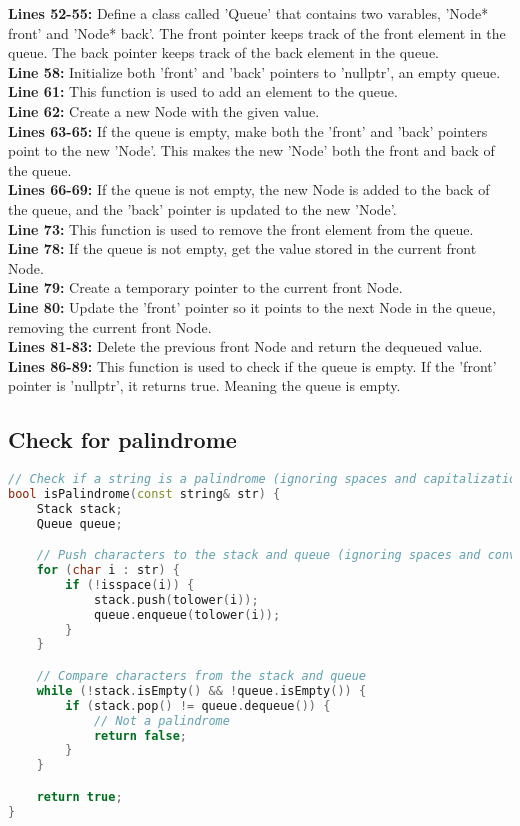 \documentclass[letterpaper, 10pt,DIV=13]{scrartcl}
\numberwithin{equation}{section} %
\numberwithin{figure}{section} %
\numberwithin{table}{section} %
\begin{document}
\textbf{Lines 52-55:} Define a class called 'Queue' that contains two varables, 'Node* front' and 'Node* back'. The front pointer keeps track of the front element in the queue. The back pointer keeps track of the back element in the queue. \\
\textbf{Line 58:} Initialize both 'front' and 'back' pointers to 'nullptr', an empty queue. \\
\textbf{Line 61:} This function is used to add an element to the queue. \\
\textbf{Line 62:} Create a new Node with the given value. \\ 
\textbf{Lines 63-65:} If the queue is empty, make both the 'front' and 'back' pointers point to the new 'Node'. This makes the new 'Node' both the front and back of the queue. \\
\textbf{Lines 66-69:} If the queue is not empty, the new Node is added to the back of the queue, and the 'back' pointer is updated to the new 'Node'. \\
\textbf{Line 73:} This function is used to remove the front element from the queue. \\
\textbf{Line 78:} If the queue is not empty, get the value stored in the current front Node. \\
\textbf{Line 79:} Create a temporary pointer to the current front Node. \\
\textbf{Line 80:} Update the 'front' pointer so it points to the next Node in the queue, removing the current front Node. \\
\textbf{Lines 81-83:} Delete the previous front Node and return the dequeued value. \\
\textbf{Lines 86-89:} This function is used to check if the queue is empty. If the 'front' pointer is 'nullptr', it returns true. Meaning the queue is empty.

\subsection{Check for palindrome}
\begin{linenumbers}
\begin{lstlisting}[language=C++, caption={Check for Palindrome}, label={code:example}]
// Check if a string is a palindrome (ignoring spaces and capitalization)
bool isPalindrome(const string& str) {
    Stack stack;
    Queue queue;

    // Push characters to the stack and queue (ignoring spaces and converting to lowercase)
    for (char i : str) {
        if (!isspace(i)) {
            stack.push(tolower(i));
            queue.enqueue(tolower(i));
        }
    }

    // Compare characters from the stack and queue
    while (!stack.isEmpty() && !queue.isEmpty()) {
        if (stack.pop() != queue.dequeue()) {
            // Not a palindrome
            return false;
        }
    }

    return true;
}
\end{lstlisting}
\end{linenumbers}
\nolinenumbers
\end{document}
